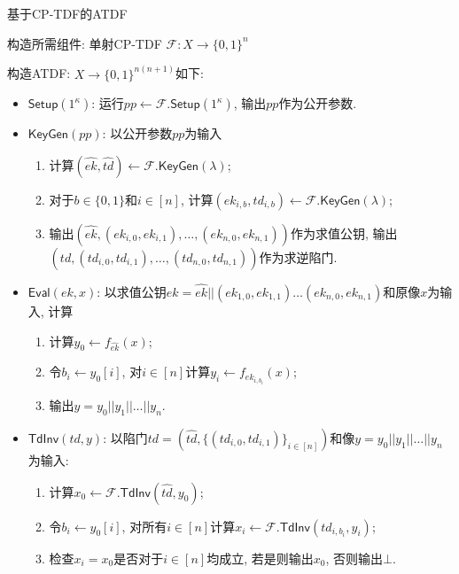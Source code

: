 \begin{construction}{基于CP-TDF的ATDF}
\begin{trivlist}
\item 构造所需组件: 单射CP-TDF $\mathcal{F}: X \rightarrow \{0,1\}^n$

\item 构造ATDF: $X \rightarrow \{0,1\}^{n(n+1)}$如下: 
\begin{itemize}
\item $\mathsf{Setup}(1^\kappa)$: 运行$pp \leftarrow \mathcal{F}.\mathsf{Setup}(1^\kappa)$, 输出$pp$作为公开参数. 

\item $\mathsf{KeyGen}(pp)$: 以公开参数$pp$为输入 
\begin{enumerate}
	\item 计算$(\hat{ek}, \hat{td}) \leftarrow \mathcal{F}.\mathsf{KeyGen}(\lambda)$;

	\item 对于$b \in \{0,1\}$和$i \in [n]$, 
		计算$(ek_{i,b}, td_{i,b}) \leftarrow \mathcal{F}.\mathsf{KeyGen}(\lambda)$;  
        
	\item 输出$(\hat{ek}, (ek_{i,0}, ek_{i,1}), \dots, (ek_{n,0}, ek_{n,1}))$作为求值公钥, 
		输出$(\hat{td}, (td_{i,0}, td_{i,1}), \dots, (td_{n,0}, td_{n,1}))$作为求逆陷门.
\end{enumerate}

\item $\mathsf{Eval}(ek, x)$: 以求值公钥$ek = \hat{ek}||(ek_{1,0}, ek_{1,1}) \dots (ek_{n,0}, ek_{n,1})$和原像$x$为输入, 计算
    \begin{enumerate}
    	\item 计算$y_0 \leftarrow f_{\hat{ek}}(x)$; 
    	\item 令$b_i \leftarrow y_0[i]$, 对$i \in [n]$计算$y_i \leftarrow f_{ek_{i,b_i}}(x)$; 
    	\item 输出$y = y_0||y_1||\dots||y_n$. 
	\end{enumerate}

\item $\mathsf{TdInv}(td, y)$: 以陷门$td = (\hat{td}, \{(td_{i,0}, td_{i,1})\}_{i \in [n]})$和像$y = y_0||y_1||\dots||y_n$为输入: 
	\begin{enumerate}
		\item 计算$x_0 \leftarrow \mathcal{F}.\mathsf{TdInv}(\hat{td}, y_0)$; 
		\item 令$b_i \leftarrow y_0[i]$, 
			对所有$i \in [n]$计算$x_i \leftarrow \mathcal{F}.\mathsf{TdInv}(td_{i,b_i}, y_i)$; 
        \item 检查$x_i = x_0$是否对于$i \in [n]$均成立, 若是则输出$x_0$, 否则输出$\bot$.
	\end{enumerate}
\end{itemize}
\end{trivlist}
\end{construction}


